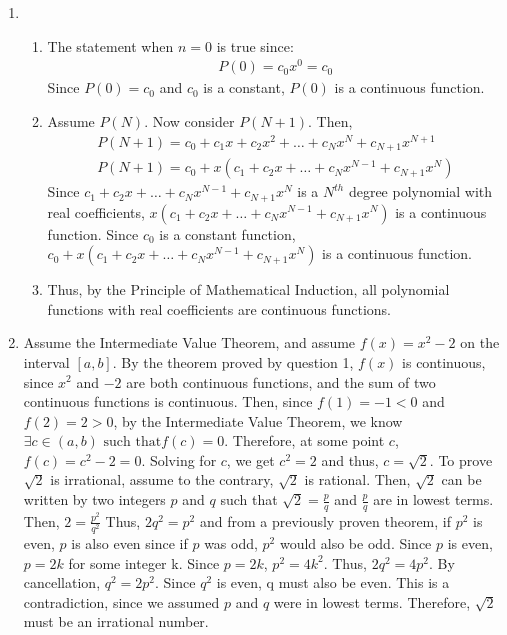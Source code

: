 \documentclass[10pt]{exam}
\begin{document}
\newcommand{\dd}{\textrm{d}}
\newcommand{\NN}{\mathbb N}
\newcommand{\CC}{\mathbb C}
\newcommand{\QQ}{\mathbb Q}
\newcommand{\ZZ}{\mathbb Z}
\newcommand{\RR}{\mathbb R}
\newcommand{\proofdone}{\hfill $\square$}

\vskip 0.5cm
\begin{enumerate}
    \item 
    \begin{enumerate}
        \item 
        The statement when $n = 0$ is true since: 
        \begin{gather}
            P(0) = c_0x^0 = c_0
        \end{gather}
        Since $P(0) = c_0$ and $c_0$ is a constant, $P(0)$ is a continuous function.
        \item 
        Assume $P(N)$. Now consider $P(N+1)$. Then, 
        \begin{gather*}
            P(N+1) = c_0 + c_1x + c_2x^2 + \dots + c_Nx^N + c_{N+1}x^{N+1}\\
            P(N+1) = c_0 + x(c_1 + c_2x + \dots + c_Nx^{N-1} + c_{N+1}x^{N})
        \end{gather*}
        Since $c_1 + c_2x + \dots + c_Nx^{N-1} + c_{N+1}x^{N}$ is a $N^{th}$ degree
        polynomial with real coefficients, $x(c_1 + c_2x + \dots + c_Nx^{N-1} + c_{N+1}x^{N})$
        is a continuous function. Since $c_0$ is a constant function, $c_0 + x(c_1 + c_2x + \dots + c_Nx^{N-1} + c_{N+1}x^{N})$ 
        is a continuous function. 
        \item 
        Thus, by the Principle of Mathematical Induction, all polynomial functions with real 
        coefficients are continuous functions. 
    \end{enumerate}
    
    \pagebreak
    \item 
    Assume the Intermediate Value Theorem, and assume $f(x) = x^2 - 2$ on the interval 
    $[a, b]$. By the theorem proved by question 1, $f(x)$ is continuous, since $x^2$ and 
    $-2$ are both continuous functions, and the sum of two continuous functions is continuous.
    Then, since $f(1) = -1 < 0$ and $f(2) = 2 > 0$, by the Intermediate Value Theorem, 
    we know $\exists c \in (a, b) \text{ such that} f(c) = 0$. Therefore, at some point $c$, 
    $f(c) = c^2 - 2 = 0$. Solving for $c$, we get $c^2 = 2$ and thus, $c = \sqrt{2}$. 
    To prove $\sqrt{2}$ is irrational, assume to the contrary, $\sqrt{2}$ is rational. 
    Then, $\sqrt{2}$ can be written by two integers $p$ and $q$ such that 
    $\sqrt{2} = \frac{p}{q}$ and $\frac{p}{q}$ are in lowest terms. Then, $2 = \frac{p^2}{q^2}$
    Thus, $2q^2 = p^2$ and from a previously proven theorem, if $p^2$ is even, $p$ is also even since 
    if $p$ was odd, $p^2$ would also be odd. Since $p$ is even, $p = 2k$ for some integer k. 
    Since $p = 2k$, $p^2 = 4k^2$. Thus, $2q^2 = 4p^2$. By cancellation, $q^2 = 2p^2$. Since 
    $q^2$ is even, q must also be even. This is a contradiction, since we assumed $p$ and $q$ 
    were in lowest terms. Therefore, $\sqrt{2}$ must be an irrational number. 


\end{enumerate}
\end{document}
